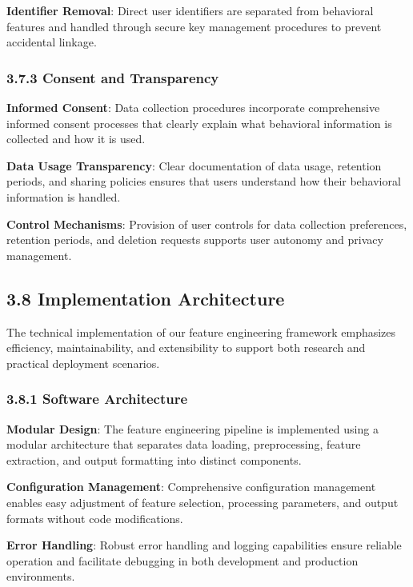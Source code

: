 \documentclass[
  11pt,
  a4paper,
]{article}
\begin{document}
\textbf{Identifier Removal}: Direct user identifiers are separated from
behavioral features and handled through secure key management procedures
to prevent accidental linkage.

\subsubsection{3.7.3 Consent and
Transparency}\label{consent-and-transparency}

\textbf{Informed Consent}: Data collection procedures incorporate
comprehensive informed consent processes that clearly explain what
behavioral information is collected and how it is used.

\textbf{Data Usage Transparency}: Clear documentation of data usage,
retention periods, and sharing policies ensures that users understand
how their behavioral information is handled.

\textbf{Control Mechanisms}: Provision of user controls for data
collection preferences, retention periods, and deletion requests
supports user autonomy and privacy management.

\subsection{3.8 Implementation
Architecture}\label{implementation-architecture}

The technical implementation of our feature engineering framework
emphasizes efficiency, maintainability, and extensibility to support
both research and practical deployment scenarios.

\subsubsection{3.8.1 Software Architecture}\label{software-architecture}

\textbf{Modular Design}: The feature engineering pipeline is implemented
using a modular architecture that separates data loading, preprocessing,
feature extraction, and output formatting into distinct components.

\textbf{Configuration Management}: Comprehensive configuration
management enables easy adjustment of feature selection, processing
parameters, and output formats without code modifications.

\textbf{Error Handling}: Robust error handling and logging capabilities
ensure reliable operation and facilitate debugging in both development
and production environments.
\end{document}
